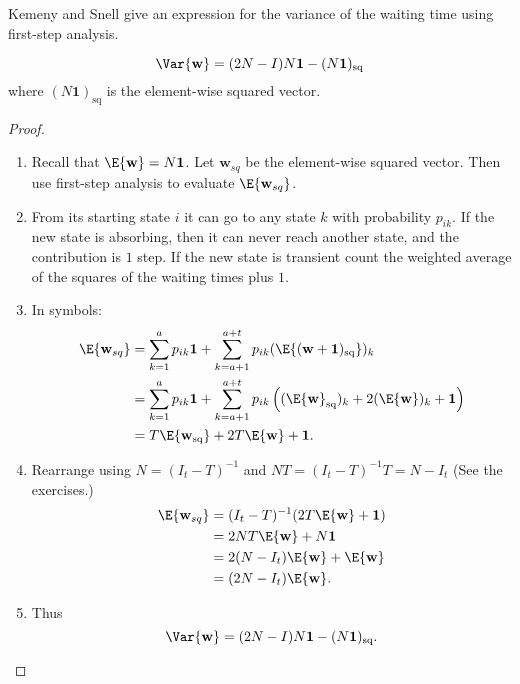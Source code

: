 \documentclass[12pt]{article}
\begin{document}
Kemeny and Snell
\cite[page 51]{kemeny60} give an expression for the variance
of the waiting time using first-step analysis.

\begin{theorem}
    \label{thm:waitingtimeabsorbtion:varwaittime}
    \[
        \Var{\mathbf{w}} = (2N - I)N\mathbf{1} - (N\mathbf{1})_{\text{sq}}
    \] where \( (N\mathbf{1})_{\text{sq}} \) is the element-wise squared
    vector.
\end{theorem}

\begin{proof}
    \begin{enumerate}
        \item
            Recall that \( \E{\mathbf{w}} = N \mathbf{1} \). Let
      \( \mathbf{w}_{sq} \) be the element-wise squared vector. Then
      use first-step analysis to evaluate \( \E{\mathbf{w}_{sq}} \).
        \item
            From its starting state \( i \) it can go to any state \( k \)
            with probability \( p_{ik} \).  If the new state is
            absorbing, then it can never reach another state, and the
            contribution is \( 1 \) step.  If the new state is transient
            count the weighted average of the squares of the waiting
            times plus \( 1 \).
          \item
            In symbols:
            \begin{align*}
                \E{\mathbf{w}_{sq}} &= \sum\limits_{k=1}^{a} p_{ik}
                \mathbf{1} + \sum\limits_{k=a+1}^{a+t} p_{ik} (\E{(\mathbf
                {w}+\mathbf{1})_{\text{sq}} })_k \\
                &= \sum\limits_{k=1}^{a} p_{ik} \mathbf{1} + \sum\limits_
                {k=a+1}^{a+t} p_{ik} \left( (\E{\mathbf{w}}_{\text{sq}})_k
                + 2 (\E{\mathbf{w}})_k + \mathbf{1} \right) \\
                &= T \E{\mathbf{w}_{\text{sq}}} + 2 T\E{\mathbf{w}} +
                \mathbf{1}.
            \end{align*}
        \item
            Rearrange using \( N = (I_t - T)^{-1} \) and \( NT = (I_t -
            T)^{-1} T = N - I_t \) (See the exercises.)
            \begin{align*}
                \E{\mathbf{w}_{sq}} &= (I_t - T)^{-1} (2 T\E{\mathbf{w}}
                + \mathbf{1}) \\
                &= 2NT \E{\mathbf{w}} + N \mathbf{1} \\
                &= 2(N-I_t) \E{\mathbf{w}} + \E{\mathbf{w}} \\
                &= (2N-I_t) \E{\mathbf{w}}.
            \end{align*}
        \item
            Thus
            \[
                \Var{\mathbf{w}} = (2N - I)N\mathbf{1} - (N\mathbf{1})_{\text
                {sq}}.
            \]
    \end{enumerate}
\end{proof}
\end{document}
